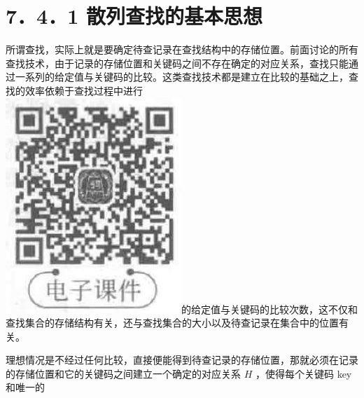 \documentclass[10pt]{article}
\begin{document}
\section*{7．4．1 散列查找的基本思想}
所谓查找，实际上就是要确定待查记录在查找结构中的存储位置。前面讨论的所有查找技术，由于记录的存储位置和关键码之间不存在确定的对应关系，查找只能通过一系列的给定值与关键码的比较。这类查找技术都是建立在比较的基础之上，查找的效率依赖于查找过程中进行\\
\includegraphics[max width=\textwidth]{2025_06_06_704745ea57b15b2333e5g-252}的给定值与关键码的比较次数，这不仅和查找集合的存储结构有关，还与查找集合的大小以及待查记录在集合中的位置有关。

理想情况是不经过任何比较，直接便能得到待查记录的存储位置，那就必须在记录的存储位置和它的关键码之间建立一个确定的对应关系 $H$ ，使得每个关键码 key 和唯一的
\end{document}
